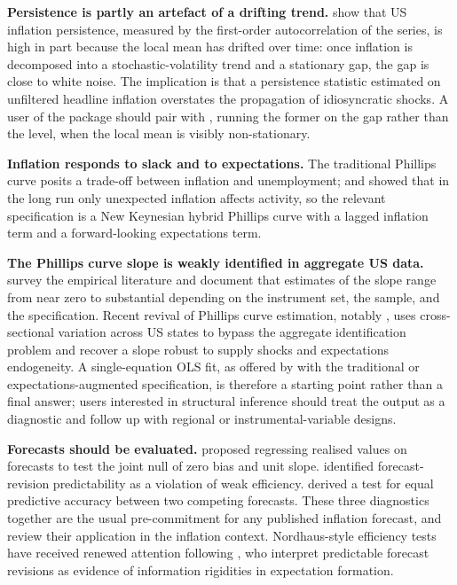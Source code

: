 \textbf{Persistence is partly an artefact of a drifting trend.}
\citet{stock2007why} show that US inflation persistence, measured by the
first-order autocorrelation of the series, is high in part because the
local mean has drifted over time: once inflation is decomposed into a
stochastic-volatility trend and a stationary gap, the gap is close to
white noise. The implication is that a persistence statistic estimated
on unfiltered headline inflation overstates the propagation of
idiosyncratic shocks. A user of the package should pair
 with , running the former on
the gap rather than the level, when the local mean is visibly
non-stationary.

\textbf{Inflation responds to slack and to expectations.} The
traditional Phillips curve \citep{phillips1958relation} posits a
trade-off between inflation and unemployment; \citet{phelps1967phillips}
and \citet{friedman1968role} showed that in the long run only unexpected
inflation affects activity, so the relevant specification is a New
Keynesian hybrid Phillips curve with a lagged inflation term and a
forward-looking expectations term.

\textbf{The Phillips curve slope is weakly identified in aggregate US
data.} \citet{mavroeidis2014empirical} survey the empirical literature
and document that estimates of the slope range from near zero to
substantial depending on the instrument set, the sample, and the
specification. Recent revival of Phillips curve estimation, notably
\citet{hazell2022slope}, uses cross-sectional variation across US states
to bypass the aggregate identification problem and recover a slope
robust to supply shocks and expectations endogeneity. A single-equation
OLS fit, as offered by  with the traditional or
expectations-augmented specification, is therefore a starting point
rather than a final answer; users interested in structural inference
should treat the output as a diagnostic and follow up with regional or
instrumental-variable designs.

\textbf{Forecasts should be evaluated.} \citet{mincer1969evaluation}
proposed regressing realised values on forecasts to test the joint null
of zero bias and unit slope. \citet{nordhaus1987forecasting} identified
forecast-revision predictability as a violation of weak efficiency.
\citet{diebold1995comparing} derived a test for equal predictive
accuracy between two competing forecasts. These three diagnostics
together are the usual pre-commitment for any published inflation
forecast, and \citet{faust2013forecasting} review their application in
the inflation context. Nordhaus-style efficiency tests have received
renewed attention following \citet{coibion2015information}, who
interpret predictable forecast revisions as evidence of information
rigidities in expectation formation.

